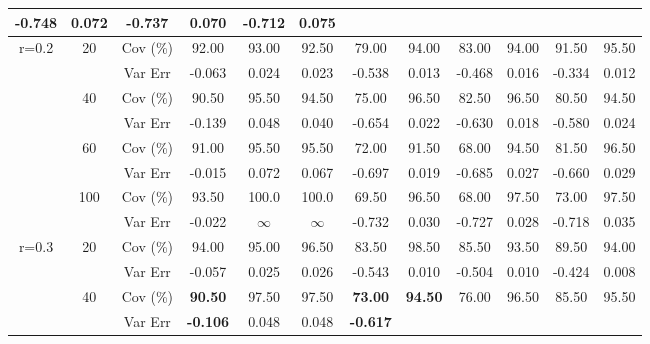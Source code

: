 \begin{table}[!h]
{\begin{tabular}{|c|c|c|c|cccccccc|}
-0.748 &
\multicolumn{1}{c|}{0.072} &
-0.737 &
\multicolumn{1}{c|}{0.070} &
-0.712 &
0.075 \\ \hline
\multirow{8}{*}{r=0.2} &
\multirow{2}{*}{20} &
Cov (\%) &
92.00 &
93.00 &
\multicolumn{1}{c|}{92.50} &
79.00 &
\multicolumn{1}{c|}{94.00} &
83.00 &
\multicolumn{1}{c|}{94.00} &
91.50 &
95.50 \\
&
&
Var Err &
-0.063 &
0.024 &
\multicolumn{1}{c|}{0.023} &
-0.538 &
\multicolumn{1}{c|}{0.013} &
-0.468 &
\multicolumn{1}{c|}{0.016} &
-0.334 &
0.012 \\ \cline{2-12} 
&
\multirow{2}{*}{40} &
Cov (\%) &
90.50 &
95.50 &
\multicolumn{1}{c|}{94.50} &
75.00 &
\multicolumn{1}{c|}{96.50} &
82.50 &
\multicolumn{1}{c|}{96.50} &
80.50 &
94.50 \\
&
&
Var Err &
-0.139 &
0.048 &
\multicolumn{1}{c|}{0.040} &
-0.654 &
\multicolumn{1}{c|}{0.022} &
-0.630 &
\multicolumn{1}{c|}{0.018} &
-0.580 &
0.024 \\ \cline{2-12} 
&
\multirow{2}{*}{60} &
Cov (\%) &
91.00 &
95.50 &
\multicolumn{1}{c|}{95.50} &
72.00 &
\multicolumn{1}{c|}{91.50} &
68.00 &
\multicolumn{1}{c|}{94.50} &
81.50 &
96.50 \\
&
&
Var Err &
-0.015 &
0.072 &
\multicolumn{1}{c|}{0.067} &
-0.697 &
\multicolumn{1}{c|}{0.019} &
-0.685 &
\multicolumn{1}{c|}{0.027} &
-0.660 &
0.029 \\ \cline{2-12} 
&
\multirow{2}{*}{100} &
Cov (\%) &
93.50 &
100.0 &
\multicolumn{1}{c|}{100.0} &
69.50 &
\multicolumn{1}{c|}{96.50} &
68.00 &
\multicolumn{1}{c|}{97.50} &
73.00 &
97.50 \\
&
&
Var Err &
-0.022 &
$\infty$ &
\multicolumn{1}{c|}{$\infty$} &
-0.732 &
\multicolumn{1}{c|}{0.030} &
-0.727 &
\multicolumn{1}{c|}{0.028} &
-0.718 &
0.035 \\ \hline
\multirow{8}{*}{r=0.3} &
\multirow{2}{*}{20} &
Cov (\%) &
94.00 &
95.00 &
\multicolumn{1}{c|}{96.50} &
83.50 &
\multicolumn{1}{c|}{98.50} &
85.50 &
\multicolumn{1}{c|}{93.50} &
89.50 &
94.00 \\
&
&
Var Err &
-0.057 &
0.025 &
\multicolumn{1}{c|}{0.026} &
-0.543 &
\multicolumn{1}{c|}{0.010} &
-0.504 &
\multicolumn{1}{c|}{0.010} &
-0.424 &
0.008 \\ \cline{2-12} 
&
\multirow{2}{*}{40} &
Cov (\%) &
\textbf{90.50} &
97.50 &
\multicolumn{1}{c|}{97.50} &
\textbf{73.00} &
\multicolumn{1}{c|}{\textbf{94.50}} &
76.00 &
\multicolumn{1}{c|}{96.50} &
85.50 &
95.50 \\
&
&
Var Err &
\textbf{-0.106} &
0.048 &
\multicolumn{1}{c|}{0.048} &
\textbf{-0.617} &

\end{tabular}}
\end{table}
